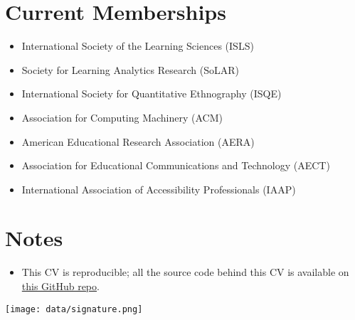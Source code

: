 \documentclass[11pt,a4paper,]{awesome-cv}
\providecommand{\tightlist}{%
	\setlength{\itemsep}{0pt}\setlength{\parskip}{0pt}}
\begin{document}
\hypertarget{current-memberships}{%
    \section{Current Memberships}\label{current-memberships}}

\begin{itemize}
    \tightlist
    \item
          International Society of the Learning Sciences (ISLS)
    \item
          Society for Learning Analytics Research (SoLAR)
    \item
          International Society for Quantitative Ethnography (ISQE)
    \item
          Association for Computing Machinery (ACM)
    \item
          American Educational Research Association (AERA)
    \item
          Association for Educational Communications and Technology (AECT)
    \item
          International Association of Accessibility Professionals (IAAP)
\end{itemize}

\hypertarget{notes}{%
    \section{Notes}\label{notes}}

\begin{itemize}
    \tightlist
    \item
          This CV is reproducible; all the source code behind this CV is
          available on \href{https://github.com/jooyoungseo/jy_CV}{this GitHub
              repo}.
\end{itemize}

\texttt{[image: data/signature.png]}\\
\end{document}
